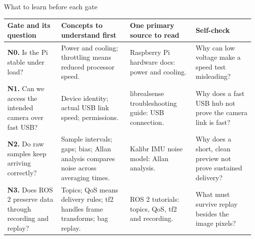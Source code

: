 \documentclass[aspectratio=169,12pt,t]{beamer}
\begin{document}
\begin{frame}{What to learn before each gate}

{\small
\begin{tabular}{@{}L{45mm}L{47mm}L{43mm}L{51mm}@{}}\toprule
\textbf{Gate and its question} & \textbf{Concepts to understand first} & \textbf{One primary source to read} & \textbf{Self-check}\\\midrule
\textbf{N0.} Is the Pi stable under load? & Power and cooling; throttling means reduced processor speed. & Raspberry Pi hardware docs: power and cooling. & Why can low voltage make a speed test misleading?\\[4pt]
\textbf{N1.} Can we access the intended camera over fast USB? & Device identity; actual USB link speed; permissions. & librealsense troubleshooting guide: USB connection. & Why does a fast USB hub not prove the camera link is fast?\\[4pt]
\textbf{N2.} Do raw samples keep arriving correctly? & Sample intervals; gaps; bias; Allan analysis compares noise across averaging times. & Kalibr IMU noise model: Allan analysis. & Why does a short, clean preview not prove sustained delivery?\\[4pt]
\textbf{N3.} Does ROS 2 preserve data through recording and replay? & Topics; QoS means delivery rules; tf2 handles frame transforms; bag replay. & ROS 2 tutorials: topics, QoS, tf2 and recording. & What must survive replay besides the image pixels?\\\bottomrule
\end{tabular}}

\end{frame}
\end{document}
